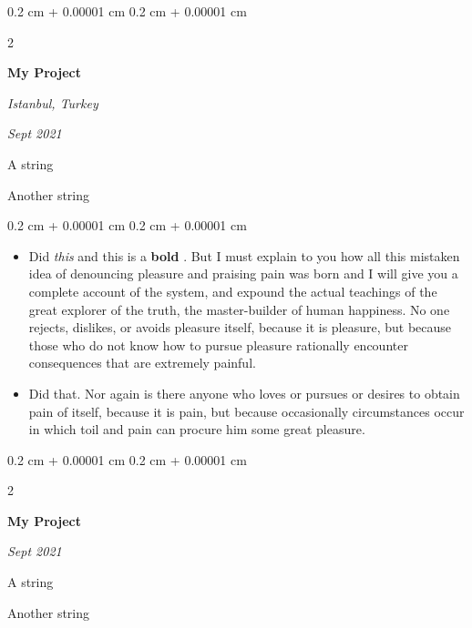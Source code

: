 \documentclass[10pt, letterpaper]{article}
\newenvironment{summary}{
    \begin{description}[
        topsep=0.10 cm,
        parsep=0.10 cm,
        partopsep=0pt,
        itemsep=0pt,
        leftmargin=0.4 cm + 10pt
    ]
}{
    \end{description}
} %
\newenvironment{highlights}{
    \begin{itemize}[
        topsep=0.10 cm,
        parsep=0.10 cm,
        partopsep=0pt,
        itemsep=0pt,
        leftmargin=0.4 cm + 10pt
    ]
}{
    \end{itemize}
} %
\newenvironment{onecolentry}{
    \begin{adjustwidth}{
        0.2 cm + 0.00001 cm
    }{
        0.2 cm + 0.00001 cm
    }
}{
    \end{adjustwidth}
} %
\newenvironment{twocolentry}[2][]{
    \onecolentry
    \def\secondColumn{#2}
    \setcolumnwidth{\fill, 4.5 cm}
    \begin{paracol}{2}
}{
    \switchcolumn \raggedleft \secondColumn
    \end{paracol}
    \endonecolentry
} %
\let\hrefWithoutArrow\href
\renewcommand{\href}[2]{\hrefWithoutArrow{#1}{\ifthenelse{\equal{#2}{}}{ }{#2 }\raisebox{.15ex}{\footnotesize \faExternalLink*}}}
\begin{document}
        \begin{twocolentry}{
        \textit{Istanbul, Turkey}    
            
        \textit{Sept 2021}}
            \textbf{My Project}
        \end{twocolentry}
            \begin{summary}
                \item A string
                \item Another string
            \end{summary}
        \vspace{0.10 cm}
        \begin{onecolentry}
            \begin{highlights}
                \item Did \textit{this} and this is a \textbf{bold} \href{https://example.com}{link}. But I must explain to you how all this mistaken idea of denouncing pleasure and praising pain was born and I will give you a complete account of the system, and expound the actual teachings of the great explorer of the truth, the master-builder of human happiness. No one rejects, dislikes, or avoids pleasure itself, because it is pleasure, but because those who do not know how to pursue pleasure rationally encounter consequences that are extremely painful.
                \item Did that. Nor again is there anyone who loves or pursues or desires to obtain pain of itself, because it is pain, but because occasionally circumstances occur in which toil and pain can procure him some great pleasure.
            \end{highlights}
        \end{onecolentry}


        \vspace{0.2 cm}

        \begin{twocolentry}{
            
            
        \textit{Sept 2021}}
            \textbf{My Project}
        \end{twocolentry}
            \begin{summary}
                \item A string
                \item Another string
            \end{summary}


        \vspace{0.2 cm}
\end{document}
